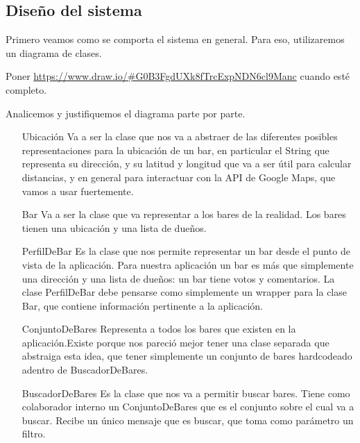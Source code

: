 \subsection{Diseño del sistema}

Primero veamos como se comporta el sistema en general. Para eso, utilizaremos un diagrama de clases.

{\color{red} Poner \url{https://www.draw.io/#G0B3FgdUXk8fTrcExpNDN6cl9Manc} cuando esté completo.}

Analicemos y justifiquemos el diagrama parte por parte.

\begin{itemize}
\item[Ubicación] Va a ser la clase que nos va a abstraer de las diferentes posibles representaciones para la ubicación de un bar, en particular el String que representa su dirección, y su latitud y longitud que va a ser útil para calcular distancias, y en general para interactuar con la API de Google Maps, que vamos a usar fuertemente.

\item[Bar] Va a ser la clase que va representar a los bares de la realidad. Los bares tienen una ubicación y una lista de dueños.

\item[PerfilDeBar] Es la clase que nos permite representar un bar desde el punto de vista de la aplicación. Para nuestra aplicación un bar es más que simplemente una dirección y una lista de dueños: un bar tiene votos y comentarios. La clase PerfilDeBar debe pensarse como simplemente un wrapper para la clase Bar, que contiene información pertinente a la aplicación.

\item[ConjuntoDeBares] Representa a todos los bares que existen en la aplicación.Existe porque nos pareció mejor tener una clase separada que abstraiga esta idea, que tener simplemente un conjunto de bares hardcodeado adentro de BuscadorDeBares.

\item[BuscadorDeBares] Es la clase que nos va a permitir buscar bares. Tiene como colaborador interno un ConjuntoDeBares que es el conjunto sobre el cual va a buscar. Recibe un único mensaje que es buscar, que toma como parámetro un filtro.
\end{itemize}


